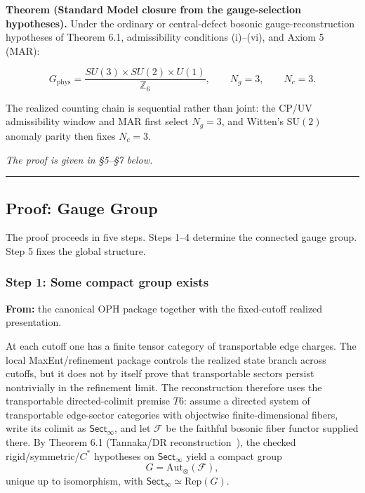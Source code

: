 \textbf{Theorem (Standard Model closure from the gauge-selection hypotheses).} Under the ordinary or central-defect bosonic gauge-reconstruction hypotheses of Theorem 6.1, admissibility conditions (i)--(vi), and Axiom 5 (MAR):

\[G_{\mathrm{phys}} = \frac{SU(3) \times SU(2) \times U(1)}{\mathbb{Z}_6}, \qquad N_g = 3, \qquad N_c = 3.\]

The realized counting chain is sequential rather than joint: the CP/UV admissibility window and MAR first select \(N_g = 3\), and Witten's \(\mathrm{SU}(2)\) anomaly parity then fixes \(N_c = 3\).

\emph{The proof is given in \S{}5--\S{}7 below.}

\begin{center}\rule{0.5\linewidth}{0.5pt}\end{center}

\subsection{Proof: Gauge Group}\label{5-proof-gauge-group}

The proof proceeds in five steps. Steps 1--4 determine the connected gauge group. Step 5 fixes the global structure.

\subsubsection{Step 1: Some compact group exists}\label{step-1-some-compact-group-exists}

\textbf{From:} the canonical OPH package together with the fixed-cutoff realized presentation.

At each cutoff one has a finite tensor category of transportable edge charges. The local MaxEnt/refinement package controls the realized state branch across cutoffs, but it does not by itself prove that transportable sectors persist nontrivially in the refinement limit. The reconstruction therefore uses the transportable directed-colimit premise \(T6\): assume a directed system of transportable edge-sector categories with objectwise finite-dimensional fibers, write its colimit as \(\mathsf{Sect}_\infty\), and let \(\mathcal F\) be the faithful bosonic fiber functor supplied there. By Theorem 6.1 (Tannaka/DR reconstruction~\cite{tannaka38,krein49,dr89,dr90}), the checked rigid/symmetric/\(C^*\) hypotheses on \(\mathsf{Sect}_\infty\) yield a compact group
\[
G=\mathrm{Aut}_\otimes(\mathcal F),
\]
unique up to isomorphism, with \(\mathsf{Sect}_\infty \simeq \mathrm{Rep}(G)\).

